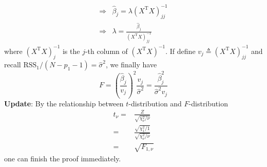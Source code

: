 \begin{sol}
\begin{align*}
\Longrightarrow & \hat{\beta}_j = \lambda (X^\mathrm{T}X)^{-1}_{jj} \\
\Longrightarrow & \lambda = \frac{\hat{\beta}_j}{(X^\mathrm{T}X)^{-1}_{jj}}
\end{align*}
where $(X^\mathrm{T}X)^{-1}_j$ is the $j$-th column of $(X^\mathrm{T}X)^{-1}$. If define $v_j\triangleq(X^\mathrm{T}X)^{-1}_{jj}$ and recall $\mathrm{RSS}_1/(N-p_1-1)=\hat{\sigma}^2$, we finally have
\[
F = \left(\frac{\hat{\beta}_j}{v_j}\right)^2 \frac{v_j}{\hat{\sigma}^2} = \frac{\hat{\beta}_j^2}{\hat{\sigma}^2v_j}
\]
\textbf{Update}: By the relationship between $t$-distribution and $F$-distribution
\begin{align*}
t_\nu=& \frac{Z}{\sqrt{\chi_\nu^2/\nu}}\\
=& \frac{\sqrt{\chi_1^2/1}}{\sqrt{\chi_\nu^2/\nu}}\\
=& \sqrt{F_{1,\nu}}
\end{align*}
one can finish the proof immediately.
\end{sol}

\begin{sol}
\end{sol}

